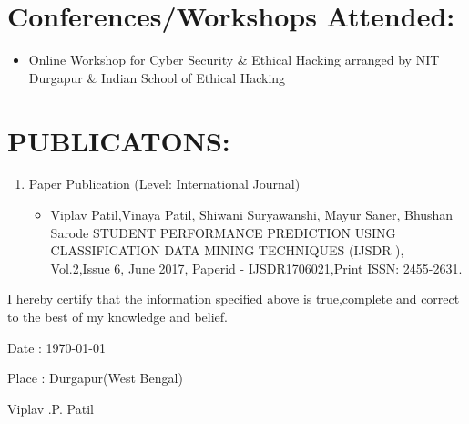 \documentclass[a4paper,10pt]{article}
\begin{document}
 
 
 
 

 \vspace{5mm}

 
 
 
\section{Conferences/Workshops Attended:}
\begin{enumerate}
   \begin{itemize}
     \item Online Workshop for Cyber Security & Ethical Hacking 
     arranged by NIT Durgapur & Indian School of Ethical Hacking
     

 
      \end{itemize}
    
\end{enumerate} 

\section{PUBLICATONS:}
\begin{enumerate}
   \item Paper Publication (Level: International Journal) 
   \begin{itemize}
     \item Viplav Patil,Vinaya Patil, Shiwani Suryawanshi, Mayur Saner, Bhushan Sarode STUDENT PERFORMANCE PREDICTION USING CLASSIFICATION DATA MINING TECHNIQUES (IJSDR  ), Vol.2,Issue 6, June 2017, Paperid - IJSDR1706021,Print ISSN: 2455-2631.
 
      \end{itemize}
    
\end{enumerate}

\vspace{5mm}
\large 
\par
I hereby certify that the information specified above is true,complete and correct to the best of my knowledge and belief.  

             
\vspace{4mm}

{\large Date : \today }
\par
{\large Place : Durgapur(West Bengal) }

\begin{flushright}
{\LARGE Viplav .P. Patil}
\end{flushright}
   
\end{document}
